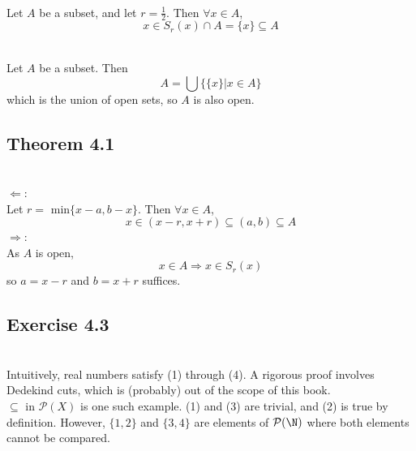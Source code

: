 \begin{solution}
 \\Let $A$ be a subset, and let $r = \frac{1}{2}$. Then $\forall x \in A$,
 $$x \in S_r(x) \cap A = \{x\} \subseteq A$$
\end{solution}


\begin{solution}
 \\Let $A$ be a subset. Then
 $$A = \bigcup\{\{x\}|x \in A\}$$
 which is the union of open sets, so $A$ is also open.
\end{solution}

\subsection{Theorem 4.1}
\setcounter{question}{0}


\begin{solution}
 \\$\Leftarrow$: \\
 Let $r =$ min$\{x-a,b-x\}$. Then $\forall x \in A$,
 $$x \in (x-r,x+r) \subseteq (a,b) \subseteq A$$
 $\Rightarrow$: \\
 As $A$ is open,
 $$x \in A \Rightarrow x \in S_r(x)$$
 so $a = x - r$ and $b = x + r$ suffices.
\end{solution}

\subsection{Exercise 4.3}
\setcounter{question}{0}


\begin{solution}
 \\Intuitively, real numbers satisfy (1) through (4). A rigorous proof involves Dedekind cuts, which is (probably) out of the scope of this book. \\
 $\subseteq$ in $\mathcal{P}(X)$ is one such example. (1) and (3) are trivial, and (2) is true by definition. However, $\{1,2\}$ and $\{3,4\}$ are elements of $\mathcal{P}(\N)$ where both elements cannot be compared.
\end{solution}

